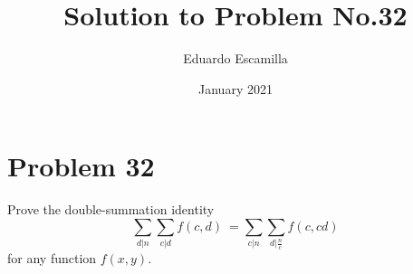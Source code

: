 
\title{Solution to Problem No.32}
\author{Eduardo Escamilla}
\date{January 2021}
\section{Problem 32}
Prove the double-summation identity
\[ \sum_{d|n} \sum_{c|d} f(c,d) \ = \sum_{c|n} \sum_{d|\frac{n}{c}} f(c,cd)\] for any function $f(x,y)$.

